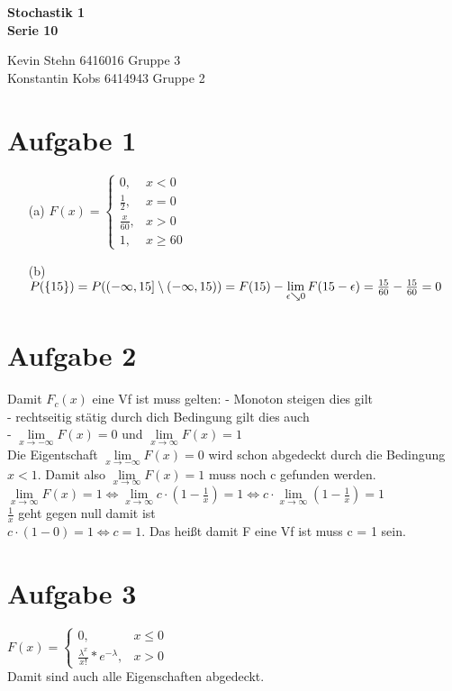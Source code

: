 \documentclass[10pt,a4paper]{article}
\begin{document}
\begin{center}
\textbf{Stochastik 1 \\ Serie 10 \\}
\end{center}

\begin{flushright}
Kevin Stehn 6416016 Gruppe 3 \\
Konstantin Kobs 6414943 Gruppe 2
\end{flushright}

\section*{Aufgabe 1}
\begin{itemize}
\item[(a)]
$ F(x)=\left\{\begin{array}{cl} 0, & x < 0\\ 
\frac{1}{2}, & x = 0 \\ 
\frac{x}{60}, & x > 0 \\
1 , & x \geq 60 \end{array}\right.$
\item[(b)]$P(\{15\}) = P((-\infty,15] \setminus (-\infty,15)) \\
= F(15) - \lim\limits_{\epsilon \searrow 0 }{F(15-\epsilon)}\\
= \frac{15}{60} - \frac{15}{60} = 0$
\end{itemize}

\section*{Aufgabe 2}
Damit $F_c(x)$ eine Vf ist muss gelten: - Monoton steigen dies gilt \\
- rechtseitig stätig durch dich Bedingung gilt dies auch\\
- $\lim\limits_{x \rightarrow -\infty }{F(x)} = 0$ und $\lim\limits_{x \rightarrow \infty }{F(x)} = 1$ \\
Die Eigentschaft $\lim\limits_{x \rightarrow -\infty }{F(x)} = 0$ wird schon abgedeckt durch die Bedingung $x < 1$. Damit also $\lim\limits_{x \rightarrow \infty }{F(x)} = 1$ muss noch c gefunden werden.\\
$\lim\limits_{x \rightarrow \infty }{F(x)} = 1 \Leftrightarrow \lim\limits_{x \rightarrow \infty }{c \cdot(1-\frac{1}{x})} = 1 \Leftrightarrow c \cdot \lim\limits_{x \rightarrow \infty }{ (1-\frac{1}{x})} = 1$ \\
$\frac{1}{x} $ geht gegen null damit ist\\
$c \cdot (1-0) = 1 \Leftrightarrow c = 1$.
Das heißt damit F eine Vf ist muss c = 1 sein.
\section*{Aufgabe 3}
$ F(x)=\left\{\begin{array}{cl} 0, & x \leq 0\\ 
\frac{\lambda^x}{x!}*e^{-\lambda}, & x > 0  \end{array}\right.$\\
Damit sind auch alle Eigenschaften abgedeckt.
\end{document}
